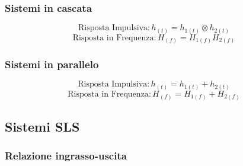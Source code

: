         \subsubsection{Sistemi in cascata}
            \[
                \text{Risposta Impulsiva}: h_{(t)} = h_{1(t)}\otimes h_{2(t)}
            \]
            \[
                \text{Risposta in Frequenza}: H_{(f)} = H_{1(f)} H_{2(f)}
            \]
        \subsubsection{Sistemi in parallelo}
            \[
                \text{Risposta Impulsiva}: h_{(t)} = h_{1(t)}+h_{2(t)}
            \]
            \[
                \text{Risposta in Frequenza}: H_{(f)} = H_{1(f)} + H_{2(f)}
            \]
    \subsection{Sistemi SLS}
        \subsubsection{Relazione ingrasso-uscita}

